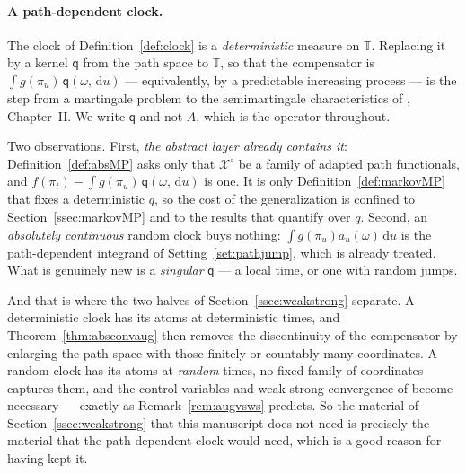 \documentclass[11pt,a4paper]{article}
\theoremstyle{plain}
\theoremstyle{definition}
\theoremstyle{remark}
\newcommand{\T}{\mathbb{T}}                     %
\newcommand{\XX}{\mathcal{X}}                  %
\newcommand{\dif}{\,\mathrm{d}}
\newcommand{\CPS}{\cite{CPS23}}
\newcommand{\JS}{\cite{JS03}}
\begin{document}
\medskip

\paragraph{A path-dependent clock.}
The clock of Definition~\ref{def:clock} is a \emph{deterministic} measure on
$\T$.  Replacing it by a kernel $\mathsf{q}$ from the path space to $\T$, so that
the compensator is $\int g(\pi_u)\,\mathsf{q}(\omega,\dif u)$ --- equivalently,
by a predictable increasing process --- is the step from a martingale problem to
the semimartingale characteristics of \JS, Chapter~II.  We write $\mathsf{q}$ and
not $A$, which is the operator throughout.

Two observations.  First, \emph{the abstract layer already contains it}:
Definition~\ref{def:absMP} asks only that $\XX^\circ$ be a family of adapted
path functionals, and $f(\pi_t)-\int g(\pi_u)\,\mathsf{q}(\omega,\dif u)$ is one.  It is only
Definition~\ref{def:markovMP} that fixes a deterministic $q$, so the cost of the
generalization is confined to Section~\ref{ssec:markovMP} and to the results
that quantify over $q$.  Second, an \emph{absolutely continuous} random clock
buys nothing: $\int g(\pi_u)a_u(\omega)\dif u$ is the path-dependent integrand of
Setting~\ref{set:pathjump}, which is already treated.  What is genuinely new is a
\emph{singular} $\mathsf{q}$ --- a local time, or one with random jumps.

And that is where the two halves of Section~\ref{ssec:weakstrong} separate.  A
deterministic clock has its atoms at deterministic times, and
Theorem~\ref{thm:absconvaug} then removes the discontinuity of the compensator by
enlarging the path space with those finitely or countably many coordinates.  A
random clock has its atoms at \emph{random} times, no fixed family of coordinates
captures them, and the control variables and weak-strong convergence of \CPS{}
become necessary --- exactly as Remark~\ref{rem:augvsws} predicts.  So the
material of Section~\ref{ssec:weakstrong} that this manuscript does not need is
precisely the material that the path-dependent clock would need, which is a good
reason for having kept it.
\end{document}
